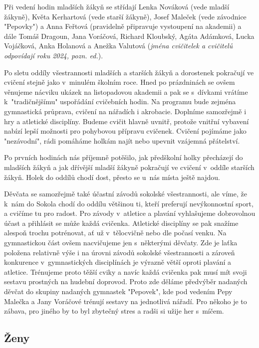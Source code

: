 \documentclass[a5paper, 12pt, twoside]{article}
\begin{document}
Při vedení hodin mladších žákyň se střídají Lenka Nováková (vede mladší
žákyně), Květa Kerhartová (vede starší žákyně), Josef Maleček (vede
závodnice "Pepovky") a Anna Feřtová (pravidelně připravuje vystoupení
na akademii) a dále Tomáš Dragoun, Jana Voráčová, Richard Kloubský,
Agáta Adámková, Lucka Vojáčková, Anka Holanová a Anežka Valutová
(\textit{jména cvičitelek a cvičitelů odpovídají roku 2024, pozn. ed.}).

Po sletu oddíly všestrannosti mladších a starších žákyň a dorostenek
pokračují ve cvičení stejně jako v~minulém školním roce. Hned po
prázdninách se ovšem věnujeme nácviku ukázek na listopadovou akademii a
pak se s~dívkami vrátíme k~"tradičnějšímu" uspořádání cvičebních
hodin. Na programu bude zejména gymnastická průprava, cvičení na
nářadích i akrobacie. Doplníme samozřejmě i hry a atletické disciplíny.
Budeme cvičit hlavně uvnitř, protože vnitřní vybavení nabízí lepší
možnosti pro pohybovou přípravu cvičenek. Cvičení pojímáme jako
"nezávodní", rádi pomáháme holkám najít nebo upevnit vzájemná
přátelství.

Po prvních hodinách nás příjemně potěšilo, jak předškolní holky
přecházejí do mladších žákyň a jak dřívější mladší žákyně pokračují ve
cvičení v~oddíle starších žákyň. Holek do oddílů chodí dost, přesto se
u~nás místa ještě najdou.

Děvčata se samozřejmě také účastní závodů sokolské všestrannosti, ale
víme, že k~nám do Sokola chodí do oddílu většinou ti, kteří preferují
nevýkonnostní sport, a cvičíme tu pro radost. Pro závody v~atletice a
plavání vyhlašujeme dobrovolnou účast a přihlásit se může každá
cvičenka. Atletické disciplíny se pak snažíme alespoň trochu potrénovat,
ať už v~tělocvičně nebo dle počasí venku. Na gymnastickou část ovšem
nacvičujeme jen s~některými děvčaty. Zde je laťka položena relativně
výše i na úrovni závodů sokolské všestrannosti a zároveň konkurence
v~gymnastických disciplínách je výrazně větší oproti plavání a atletice.
Trénujeme proto těžší cviky a navíc každá cvičenka pak musí mít svoji
sestavu prostných na hudební doprovod. Proto zde děláme předvýběr
nadaných děvčat do skupiny nadaných gymnastek "Pepovek", kde pod
vedením Pepy Malečka a Jany Voráčové trénují sestavy na jednotlivá
nářadí. Pro někoho je to zábava, pro jiného by to byl zbytečný stres a
radši si užije her s~míčem.

\subsection{Ženy}
\end{document}
